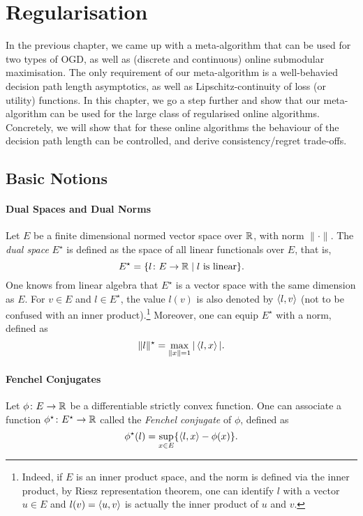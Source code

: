 \chapter{Regularisation}\label{chap:rftl}
In the previous chapter, we came up with a meta-algorithm that can be used for two types of OGD, as well as (discrete and continuous) online submodular maximisation. The only requirement of our meta-algorithm is a well-behavied decision path length asymptotics, as well as Lipschitz-continuity of loss (or utility) functions. In this chapter, we go a step further and show that our meta-algorithm can be used for the large class of regularised online algorithms. Concretely, we will show that for these online algorithms the behaviour of the decision path length can be controlled, and derive consistency/regret trade-offs.

\section{Basic Notions}
\subsubsection*{Dual Spaces and Dual Norms}
Let $E$ be a finite dimensional normed vector space over $\mathbb{R}$, with norm $\|\cdot\|$. The \emph{dual space} $E^\star$ is defined as the space of all linear functionals over $E$, that is,
\[
    E^\star = \{ l\colon E\to \mathbb{R} \mid l\text{ is linear} \}.
\]
One knows from linear algebra that $E^\star$ is a vector space with the same dimension as $E$. 
For $v\in E$ and $l\in E^\star$, the value $l(v)$ is also denoted by $\left\langle l,v \right\rangle$ (not to be confused with an inner product).\footnote{Indeed, if $E$ is an inner product space, and the norm is defined via the inner product, by Riesz representation theorem, one can identify $l$ with a vector $u\in E$ and $l(v) = \left\langle u,v \right\rangle$ is actually the inner product of $u$ and $v$.} Moreover, one can equip $E^\star$ with a norm, defined as
\[
    \|l\|^\star = \max_{\|x\| = 1} |\left\langle l,x \right\rangle|.
\]

\subsubsection*{Fenchel Conjugates}
Let $\phi\colon E \to \mathbb{R}$ be a differentiable strictly convex function. One can associate a function $\phi^\star\colon E^\star \to \mathbb{R}$ called the \emph{Fenchel conjugate} of $\phi$, defined as
\[
    \phi^\star (l) = \sup_{x\in E} \{ \left\langle l,x \right\rangle - \phi(x) \}. 
\]

